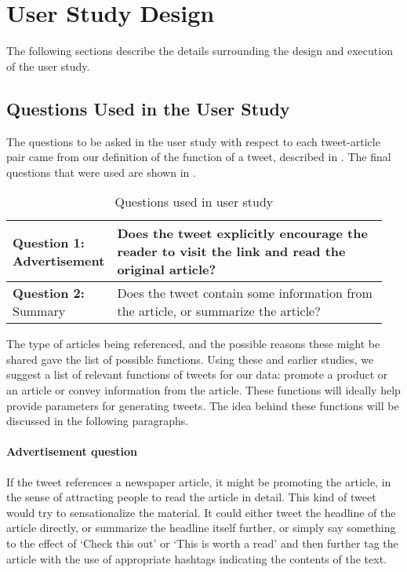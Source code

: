 \section{User Study Design}

The following sections describe the details surrounding the design and execution of the user study. 

\subsection{Questions Used in the User Study}
\label{sec:qs}

The questions to be asked in the user study with respect to each tweet-article pair came from our definition of the function of a tweet, described in . The final questions that were used are shown in .  

\begin{table}[!t]
\centering
\begin{tabular}{|p{0.15\linewidth}|p{0.8\linewidth}|}
\hline
\textbf{Question 1:} Advertisement & Does the tweet explicitly encourage the reader to visit the link and read the original article? \\ \hline
\textbf{Question 2:} Summary & Does the tweet contain some information from the article, or summarize the article?             \\ \hline
\end{tabular}
\caption{Questions used in user study}
\label{tab:mturkqs}
\end{table} 

The type of articles being referenced, and the possible reasons these might be shared gave the list of possible functions. Using these and earlier studies, we suggest a list of relevant functions of tweets for our data: promote a product or an article or convey information from the article. These functions will ideally help provide parameters for generating tweets. The idea behind these functions will be discussed in the following paragraphs. 

\paragraph{Advertisement question} If the tweet references a newspaper article, it might be promoting the article, in the sense of attracting people to read the article in detail. This kind of tweet would try to sensationalize the material. It could either tweet the headline of the article directly, or summarize the headline itself further, or simply say something to the effect of `Check this out' or `This is worth a read' and then further tag the article with the use of appropriate hashtags indicating the contents of the text.

